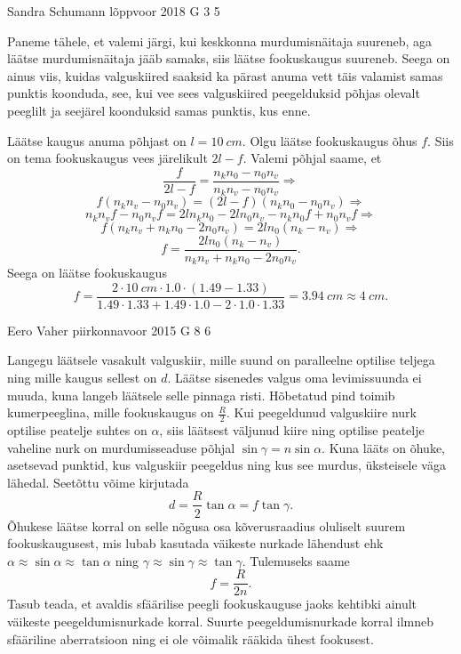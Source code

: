 \documentclass[11pt]{article}
\begin{document}
{%
{Sandra Schumann} %
{lõppvoor} %
{2018} %
{G 3} %
{5} %
{

\ifSolution
Paneme tähele, et valemi järgi, kui keskkonna murdumisnäitaja suureneb, aga läätse murdumisnäitaja jääb samaks, siis läätse fookuskaugus suureneb. Seega on ainus viis, kuidas valguskiired saaksid ka pärast anuma vett täis valamist samas punktis koonduda, see, kui vee sees valguskiired peegelduksid põhjas olevalt peeglilt ja seejärel koonduksid samas punktis, kus enne.

Läätse kaugus anuma põhjast on $l = \SI{10}{cm}$. Olgu läätse fookuskaugus õhus $f$. Siis on tema fookuskaugus vees järelikult $2l-f$. Valemi põhjal saame, et
\[ \frac{f}{2l-f} = \frac{n_k n_0 - n_0 n_v}{n_k n_v - n_0 n_v}\Rightarrow \]
\[ f(n_k n_v - n_0 n_v) = (2l-f)(n_k n_0 - n_0 n_v)\Rightarrow \]
\[ n_k n_v f - n_0 n_v f = 2l n_k n_0 - 2l n_0 n_v - n_k n_0 f + n_0 n_v f\Rightarrow \]
\[ f (n_k n_v + n_k n_0 - 2 n_0 n_v) = 2l n_0 (n_k - n_v)\Rightarrow \]
\[ f = \frac{2l n_0 (n_k - n_v)}{n_k n_v + n_k n_0 - 2 n_0 n_v}. \]
Seega on läätse fookuskaugus 
\[ f = \frac{\num{2} \cdot \SI{10}{cm} \cdot \num{1,0} \cdot (\num{1,49} - \num{1,33})}{\num{1,49}
\cdot \num{1,33} + \num{1,49} \cdot \num{1,0} - \num{2} \cdot \num{1,0} \cdot \num{1,33}} = \SI{3,94}{cm}
\approx \SI{4}{cm}. \]
\fi
}

{Eero Vaher} %
{piirkonnavoor} %
{2015} %
{G 8} %
{6} %
{

\ifSolution
Langegu läätsele vasakult valguskiir, mille suund on paralleelne optilise teljega ning mille kaugus sellest on $d$. Läätse sisenedes valgus oma levimissuunda ei muuda, kuna langeb läätsele selle pinnaga risti. Hõbetatud pind toimib kumerpeeglina, mille fookuskaugus on $\frac{R}{2}$. Kui peegeldunud valguskiire nurk optilise peatelje suhtes on $\alpha$, siis läätsest väljunud kiire ning optilise peatelje vaheline nurk on murdumisseaduse põhjal $\sin\gamma=n\sin\alpha$. Kuna lääts on õhuke, asetsevad punktid, kus valguskiir peegeldus ning kus see murdus, üksteisele väga lähedal. Seetõttu võime kirjutada
\[ d=\frac{R}{2}\tan\alpha=f\tan\gamma. \]
Õhukese läätse korral on selle nõgusa osa kõverusraadius oluliselt suurem fookuskaugusest, mis lubab kasutada väikeste nurkade lähendust ehk $\alpha\approx\sin\alpha\approx\tan\alpha$ ning $\gamma\approx\sin\gamma\approx\tan\gamma$. Tulemuseks saame
\[ f=\frac{R}{2n}. \]
Tasub teada, et avaldis sfäärilise peegli fookuskauguse jaoks kehtibki ainult väikeste peegeldumisnurkade korral. Suurte peegeldumisnurkade korral ilmneb sfääriline aberratsioon ning ei ole võimalik rääkida ühest fookusest.

}}
\end{document}
